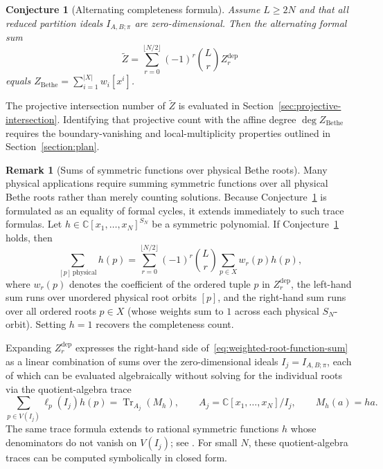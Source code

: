 \documentclass[11pt]{article}
\newtheorem{conjecture}[proposition]{Conjecture}
\theoremstyle{definition}
\newtheorem{remark}[proposition]{Remark}
\newcommand{\C}{\mathbb{C}}
\begin{document}
\begin{conjecture}[Alternating completeness formula]
	\label{conj:alternating-completeness}
	Assume $L\ge 2N$ and that all reduced partition ideals $I_{A,B;\pi}$ are
	zero-dimensional. Then the alternating formal sum
	\begin{equation}\label{eq:central-alternating-cycle}
		\boxed{
			\tilde{Z}=\sum_{r=0}^{\lfloor N/2\rfloor}(-1)^r\binom{L}{r}
			Z^{\mathrm{dep}}_r
		}
	\end{equation}
	equals $Z_{\mathrm{Bethe}}=\sum_{i=1}^{|X|}w_i[x^i]$.
\end{conjecture}

The projective intersection number of $\tilde{Z}$ is evaluated in Section~\ref{sec:projective-intersection}. Identifying that projective count with the affine degree $\deg Z_{\mathrm{Bethe}}$ requires the boundary-vanishing and local-multiplicity properties outlined in Section~\ref{section:plan}.

\begin{remark}[Sums of symmetric functions over physical Bethe roots]
Many physical applications require summing symmetric functions over all physical Bethe roots
rather than merely counting solutions. Because Conjecture~\ref{conj:alternating-completeness} is formulated as an equality of formal cycles, it extends immediately to such trace formulas. Let $h\in\C[x_1,\ldots,x_N]^{S_N}$ be a symmetric polynomial. If
Conjecture~\ref{conj:alternating-completeness} holds, then
\begin{equation}\label{eq:weighted-root-function-sum}
 \sum_{[p]\,\mathrm{physical}}h(p)
 =\sum_{r=0}^{\lfloor N/2\rfloor}(-1)^r\binom{L}{r}
 \sum_{p\in X}w_r(p)h(p),
\end{equation}
where $w_r(p)$ denotes the coefficient of the ordered tuple $p$ in
$Z^{\mathrm{dep}}_r$, the left-hand sum runs over unordered physical root orbits $[p]$, and the right-hand sum
runs over all ordered roots $p\in X$ (whose weights sum to $1$ across each physical $S_N$-orbit). Setting $h=1$ recovers the completeness count.

Expanding $Z^{\mathrm{dep}}_r$ expresses the right-hand side of~\eqref{eq:weighted-root-function-sum} as a linear combination of sums over the zero-dimensional ideals $I_j=I_{A,B;\pi}$, each of which can be evaluated algebraically without solving for the individual roots via the quotient-algebra trace
\[
 \sum_{p\in V(I_j)}\ell_p(I_j)h(p)
 =\operatorname{Tr}_{A_j}(M_h),\qquad A_j=\C[x_1,\ldots,x_N]/I_j,\qquad M_h(a)=ha.
\]
The same trace formula extends to rational symmetric functions $h$ whose denominators do not vanish on $V(I_j)$; see \cite{JZ2018}. For small $N$, these quotient-algebra traces can be computed symbolically in closed form.
\end{remark}
\end{document}
